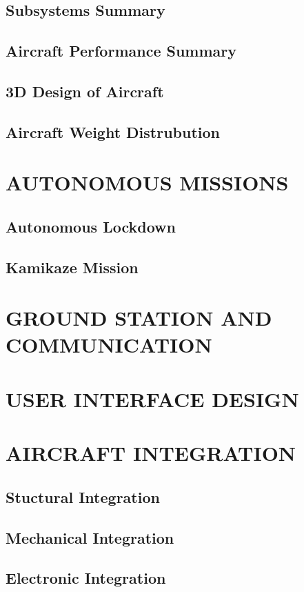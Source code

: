 \documentclass[12pt]{article}
\begin{document}
\subsection{Subsystems Summary}
\subsection{Aircraft Performance Summary}
\subsection{3D Design of Aircraft}
\subsection{Aircraft Weight Distrubution}



\section{AUTONOMOUS MISSIONS}
\subsection{Autonomous Lockdown}
\subsection{Kamikaze Mission}

\section{GROUND STATION AND COMMUNICATION}

\section{USER INTERFACE DESIGN}

\section{AIRCRAFT INTEGRATION}
\subsection{Stuctural Integration}
\subsection{Mechanical Integration}
\subsection{Electronic Integration}
\end{document}
